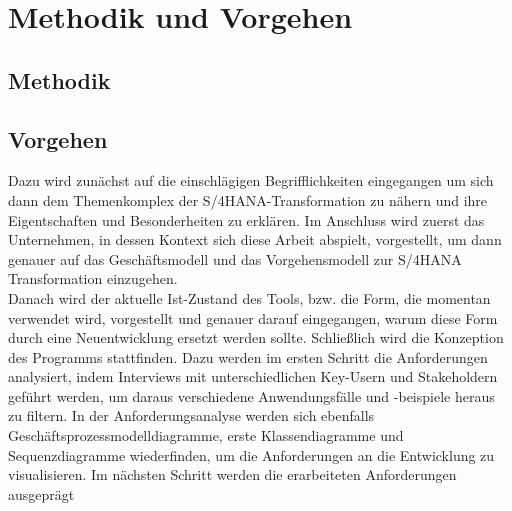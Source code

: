 \section{Methodik und Vorgehen}
\subsection{Methodik}

\subsection{Vorgehen}
Dazu wird zunächst auf die einschlägigen Begrifflichkeiten eingegangen um sich dann dem Themenkomplex der S/4HANA-Transformation zu nähern und ihre Eigentschaften und Besonderheiten zu erklären. Im Anschluss wird zuerst das Unternehmen, in dessen Kontext sich diese Arbeit abspielt, vorgestellt, um dann genauer auf das Geschäftsmodell und das Vorgehensmodell zur S/4HANA Transformation einzugehen. \\
Danach wird der aktuelle Ist-Zustand des Tools, bzw. die Form, die momentan verwendet wird, vorgestellt und genauer darauf eingegangen, warum diese Form durch eine Neuentwicklung ersetzt werden sollte. Schließlich wird die Konzeption des Programms stattfinden. Dazu werden im ersten Schritt die Anforderungen analysiert, indem Interviews mit unterschiedlichen Key-Usern und Stakeholdern geführt werden, um daraus verschiedene Anwendungsfälle und -beispiele heraus zu filtern. In der Anforderungsanalyse werden sich ebenfalls Geschäftsprozessmodelldiagramme, erste Klassendiagramme und Sequenzdiagramme wiederfinden, um die Anforderungen an die Entwicklung zu visualisieren. Im nächsten Schritt werden die erarbeiteten Anforderungen ausgeprägt
